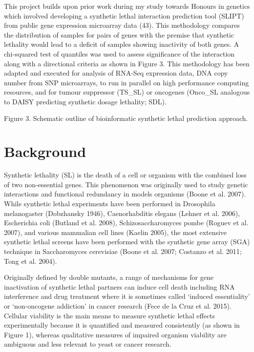 This project builds upon prior work during my study towards Honours in genetics which involved developing a synthetic lethal interaction prediction tool (SLIPT) from public gene expression microarray data (43). This methodology compares the distribution of samples for pairs of genes with the premise that synthetic lethality would lead to a deficit of samples showing inactivity of both genes. A chi-squared test of quantiles was used to assess significance of the interaction along with a directional criteria as shown in Figure 3. This methodology has been adapted and executed for analysis of RNA-Seq expression data, DNA copy number from SNP microarrays, to run in parallel on high performance computing resources, and for tumour suppressor (TS\_SL) or oncogenes (Onco\_SL analogous to DAISY predicting synthetic dosage lethality; SDL).

Figure 3. Schematic outline of bioinformatic synthetic lethal prediction approach.

\section{Background}

Synthetic lethality (SL) is the death of a cell or organism with the combined loss of two non-essential genes.   This phenomenon was originally used to study genetic interactions and functional redundancy in models organisms (Boone et al. 2007).   While synthetic lethal experiments have been performed in Drosophila melanogaster (Dobzhansky 1946), Caenorhabditis elegans (Lehner et al. 2006), Escherichia coli (Butland et al. 2008), Schizosaccharomyces pombe (Roguev et al. 2007), and various mammalian cell lines (Kaelin 2005), the most extensive synthetic lethal screens have been performed with the synthetic gene array (SGA) technique in Saccharomyces cerevisiae (Boone et al. 2007; Costanzo et al. 2011; Tong et al. 2004).  

Originally defined by double mutants, a range of mechanisms for gene inactivation of synthetic lethal partners can induce cell death including RNA interference and drug treatment where it is sometimes called ‘induced essentiality’ or ‘non-oncogene addiction’ in cancer research (Fece de la Cruz et al. 2015).  Cellular viability is the main means to measure synthetic lethal effects experimentally because it is quantified and measured consistently (as shown in Figure 1), whereas qualitative measures of impaired organism viability are ambiguous and less relevant to yeast or cancer research.

